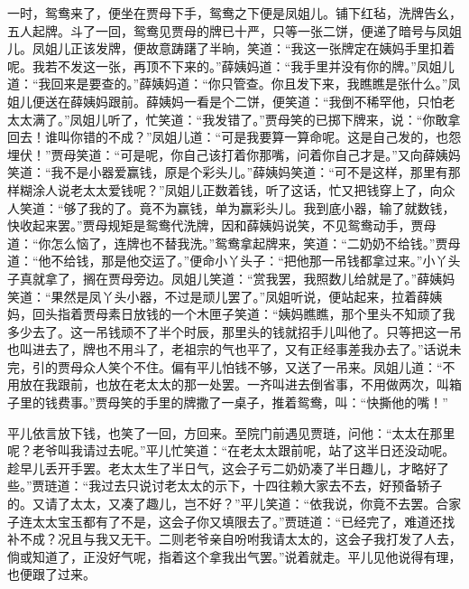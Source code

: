 一时，鸳鸯来了，便坐在贾母下手，鸳鸯之下便是凤姐儿。铺下红毡，洗牌告幺，五人起牌。斗了一回，鸳鸯见贾母的牌已十严，只等一张二饼，便递了暗号与凤姐儿。凤姐儿正该发牌，便故意踌躇了半晌，笑道：``我这一张牌定在姨妈手里扣着呢。我若不发这一张，再顶不下来的。''薛姨妈道：``我手里并没有你的牌。''凤姐儿道：``我回来是要查的。''薛姨妈道：``你只管查。你且发下来，我瞧瞧是张什么。''凤姐儿便送在薛姨妈跟前。薛姨妈一看是个二饼，便笑道：``我倒不稀罕他，只怕老太太满了。''凤姐儿听了，忙笑道：``我发错了。''贾母笑的已掷下牌来，说：``你敢拿回去！谁叫你错的不成？''凤姐儿道：``可是我要算一算命呢。这是自己发的，也怨埋伏！''贾母笑道：``可是呢，你自己该打着你那嘴，问着你自己才是。''又向薛姨妈笑道：``我不是小器爱赢钱，原是个彩头儿。''薛姨妈笑道：``可不是这样，那里有那样糊涂人说老太太爱钱呢？''凤姐儿正数着钱，听了这话，忙又把钱穿上了，向众人笑道：``够了我的了。竟不为赢钱，单为赢彩头儿。我到底小器，输了就数钱，快收起来罢。''贾母规矩是鸳鸯代洗牌，因和薛姨妈说笑，不见鸳鸯动手，贾母道：``你怎么恼了，连牌也不替我洗。''鸳鸯拿起牌来，笑道：``二奶奶不给钱。''贾母道：``他不给钱，那是他交运了。''便命小丫头子：``把他那一吊钱都拿过来。''小丫头子真就拿了，搁在贾母旁边。凤姐儿笑道：``赏我罢，我照数儿给就是了。''薛姨妈笑道：``果然是凤丫头小器，不过是顽儿罢了。''凤姐听说，便站起来，拉着薛姨妈，回头指着贾母素日放钱的一个木匣子笑道：``姨妈瞧瞧，那个里头不知顽了我多少去了。这一吊钱顽不了半个时辰，那里头的钱就招手儿叫他了。只等把这一吊也叫进去了，牌也不用斗了，老祖宗的气也平了，又有正经事差我办去了。''话说未完，引的贾母众人笑个不住。偏有平儿怕钱不够，又送了一吊来。凤姐儿道：``不用放在我跟前，也放在老太太的那一处罢。一齐叫进去倒省事，不用做两次，叫箱子里的钱费事。''贾母笑的手里的牌撒了一桌子，推着鸳鸯，叫：``快撕他的嘴！''

平儿依言放下钱，也笑了一回，方回来。至院门前遇见贾琏，问他：``太太在那里呢？老爷叫我请过去呢。''平儿忙笑道：``在老太太跟前呢，站了这半日还没动呢。趁早儿丢开手罢。老太太生了半日气，这会子亏二奶奶凑了半日趣儿，才略好了些。''贾琏道：``我过去只说讨老太太的示下，十四往赖大家去不去，好预备轿子的。又请了太太，又凑了趣儿，岂不好？''平儿笑道：``依我说，你竟不去罢。合家子连太太宝玉都有了不是，这会子你又填限去了。''贾琏道：``已经完了，难道还找补不成？况且与我又无干。二则老爷亲自吩咐我请太太的，这会子我打发了人去，倘或知道了，正没好气呢，指着这个拿我出气罢。''说着就走。平儿见他说得有理，也便跟了过来。

